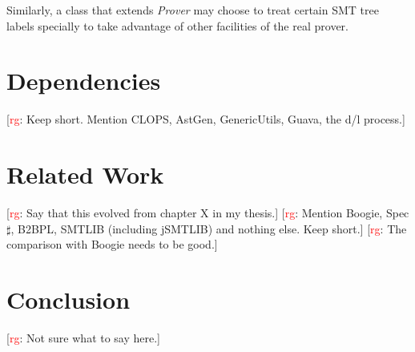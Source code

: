 \documentclass{llncs}
\newcommand{\rg}[1]{{\small [\textcolor{red}{rg}: #1]}}
\begin{document}
Similarly, a class that extends \textit{Prover} may choose to
treat certain SMT tree labels specially to take advantage of
other facilities of the real prover.

\section{Dependencies} %

\rg{Keep short. Mention CLOPS, AstGen, GenericUtils, Guava, the d/l
process.}

\section{Related Work} %

\rg{Say that this evolved from chapter X in my thesis.}
\rg{Mention Boogie, Spec$\sharp$, B2BPL, SMTLIB (including jSMTLIB) and
nothing else. Keep short.}
\rg{The comparison with Boogie needs to be good.}

\section{Conclusion} %

\rg{Not sure what to say here.}



\end{document}
